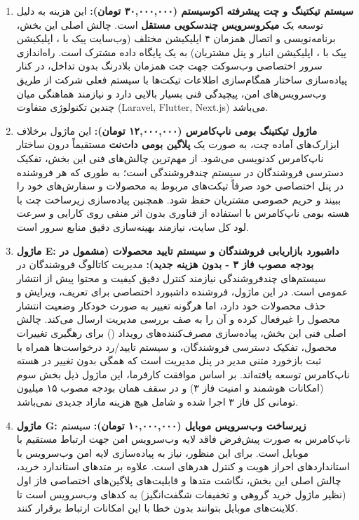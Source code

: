 \documentclass[11pt,a4paper]{article}
\begin{document}
\begin{enumerate}
    \item \textbf{سیستم تیکتینگ و چت پیشرفته اکوسیستم (۳۰,۰۰۰,۰۰۰ تومان):}
    این هزینه به دلیل توسعه یک \textbf{میکروسرویس چندسکویی  مستقل} است. چالش اصلی این بخش، برنامه‌نویسی و اتصال همزمان ۴ اپلیکیشن مختلف (وب‌سایت پیک با ، اپلیکیشن پیک با ، اپلیکیشن انبار و پنل مشتریان) به یک پایگاه داده مشترک است. راه‌اندازی سرور اختصاصی وب‌سوکت جهت چت همزمان بلادرنگ بدون تداخل، در کنار پیاده‌سازی ساختار همگام‌سازی اطلاعات تیکت‌ها با سیستم  فعلی شرکت از طریق وب‌سرویس‌های امن، پیچیدگی فنی بسیار بالایی دارد و نیازمند هماهنگی میان چندین تکنولوژی متفاوت (Laravel, Flutter, Next.js) می‌باشد.
    
    \item \textbf{ماژول تیکتینگ بومی ناپ‌کامرس (۱۲,۰۰۰,۰۰۰ تومان):}
    این ماژول برخلاف ابزارک‌های آماده چت، به صورت یک \textbf{پلاگین بومی دات‌نت } مستقیماً درون ساختار ناپ‌کامرس کدنویسی می‌شود. از مهم‌ترین چالش‌های فنی این بخش، تفکیک دسترسی فروشندگان در سیستم چندفروشندگی است؛ به طوری که هر فروشنده در پنل اختصاصی خود صرفاً تیکت‌های مربوط به محصولات و سفارش‌های خود را ببیند و حریم خصوصی مشتریان حفظ شود. همچنین پیاده‌سازی زیرساخت چت با هسته بومی ناپ‌کامرس با استفاده از فناوری  بدون اثر منفی روی کارایی و سرعت لود کل سایت، نیازمند بهینه‌سازی دقیق منابع سرور است.
    
    \item \textbf{ماژول E: داشبورد بازاریابی فروشندگان و سیستم تایید محصولات (مشمول در بودجه مصوب فاز ۳ - بدون هزینه جدید):}
    مدیریت کاتالوگ فروشندگان در سیستم‌های چندفروشندگی نیازمند کنترل دقیق کیفیت و محتوا پیش از انتشار عمومی است. در این ماژول، فروشنده داشبورد اختصاصی برای تعریف، ویرایش و حذف محصولات خود دارد، اما هرگونه تغییر به صورت خودکار وضعیت انتشار محصول را غیرفعال کرده و آن را به صف بررسی مدیریت ارسال می‌کند. چالش اصلی فنی این بخش، پیاده‌سازی مصرف‌کننده‌های رویداد () برای رهگیری تغییرات محصول، تفکیک دسترسی فروشندگان، و سیستم تایید/رد درخواست‌ها همراه با ثبت بازخورد متنی مدیر در پنل مدیریت است که همگی بدون تغییر در هسته ناپ‌کامرس توسعه یافته‌اند. بر اساس موافقت کارفرما، این ماژول ذیل بخش سوم (امکانات هوشمند و امنیت فاز ۳) و در سقف همان بودجه مصوب ۱۵ میلیون تومانی کل فاز ۳ اجرا شده و شامل هیچ هزینه مازاد جدیدی نمی‌باشد.
    
    \item \textbf{ماژول G: زیرساخت وب‌سرویس موبایل (۱۰,۰۰۰,۰۰۰ تومان):}
    سیستم ناپ‌کامرس به صورت پیش‌فرض فاقد لایه وب‌سرویس امن جهت ارتباط مستقیم با موبایل است. برای این منظور، نیاز به پیاده‌سازی لایه امن وب‌سرویس  با استانداردهای احراز هویت  و کنترل هدرهای  است. علاوه بر متدهای استاندارد خرید، چالش اصلی این بخش، نگاشت متدها و قابلیت‌های پلاگین‌های اختصاصی فاز اول (نظیر ماژول خرید گروهی و تخفیفات شگفت‌انگیز) به کدهای وب‌سرویس است تا کلاینت‌های موبایل بتوانند بدون خطا با این امکانات ارتباط برقرار کنند.
    

\end{enumerate}
\end{document}

